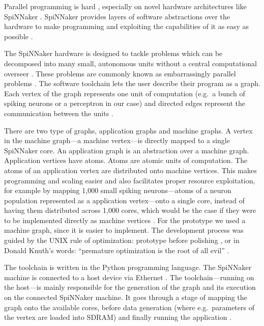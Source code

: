 \documentclass[]{article}
\begin{document}
Parallel programming is hard \citep{lee_2011}, especially on novel
hardware architectures like SpiNNaker \citep{brown_et_al_2015}.
SpiNNaker provides layers of software abstractions over the hardware
to make programming and exploiting the capabilities of it as easy as
possible \citep{furber_et_al_2020}.

The SpiNNaker hardware is designed to tackle problems which can be
decomposed into many small, autonomous units without a central
computational overseer \citep{brown_et_al_2015}.
These problems are commonly known as embarrassingly parallel problems
\citep{foster_1995}.
The software toolchain lets the user describe their program as a
graph.
Each vertex of the graph represents one unit of computation
(e.g.\ a bunch of spiking neurons or a perceptron in our case)
and directed edges represent the communication between the units
\citep{furber_et_al_2020}.

There are two type of graphs, application graphs and machine graphs.
A vertex in the machine graph---a machine vertex---is directly mapped
to a single SpiNNaker core.
An application graph is an abstraction over a machine graph.
Application vertices have atoms.
Atoms are atomic units of computation.
The atoms of an application vertex are distributed onto machine
vertices.
This makes programming and scaling easier and also facilitates proper
resource exploitation, for example by mapping 1,000 small spiking
neurons---atoms of a neuron population represented as a application
vertex---onto a single core, instead of having them distributed across
1,000 cores, which would be the case if they were to be implemented
directly as machine vertices \citep{furber_et_al_2020}.
For the prototype we used a machine graph, since it is easier to
implement.
The development process was guided by the UNIX rule of optimization:
prototype before polishing \citep{raymond_2003}, or in Donald Knuth's
words: ``premature optimization is the root of all evil''
\citep{knuth_1974}.

The toolchain is written in the Python programming language.
The SpiNNaker machine is connected to a host device via Ethernet
\citep{rowley_et_al_2019}.
The toolchain---running on the host---is mainly responsible for
the generation of the graph and its execution on the connected
SpiNNaker machine.
It goes through a stage of mapping the graph onto the available cores,
before data generation (where e.g.\ parameters of the vertex are
loaded into SDRAM) and finally running the application
\citep{furber_et_al_2020}.
\end{document}
